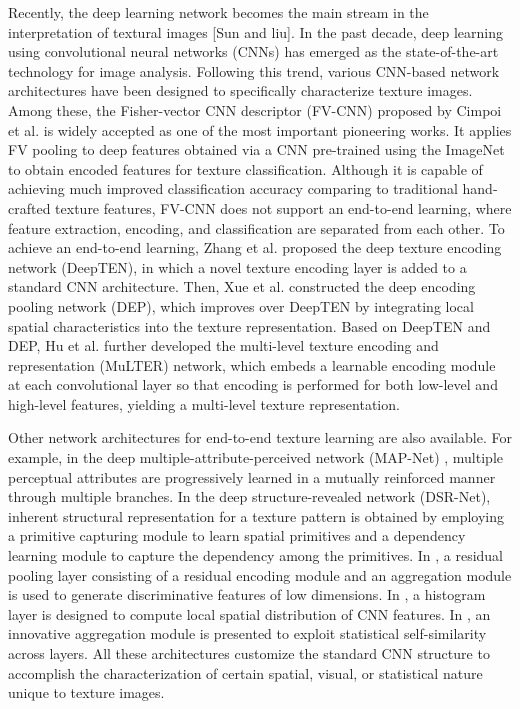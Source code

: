 \documentclass{aci}
\numberwithin{equation}{section}
\begin{document}
Recently, the deep learning network becomes the main stream in the
interpretation of textural images [Sun and liu]. In the past decade, deep
learning using convolutional neural networks (CNNs)
\cite{krizhevsky_imagenet_2017} has emerged as the state-of-the-art technology
for image analysis. Following this trend, various CNN-based network
architectures have been designed to specifically characterize texture images.
Among these, the Fisher-vector CNN descriptor (FV-CNN) proposed by Cimpoi et al.
\cite{cimpoi_describing_2014} is widely accepted as one of the most important
pioneering works. It applies FV pooling to deep features obtained via a CNN
pre-trained using the ImageNet \cite{krizhevsky_imagenet_2017} to obtain encoded
features for texture classification. Although it is capable of achieving much
improved classification accuracy comparing to traditional hand-crafted texture
features, FV-CNN does not support an end-to-end learning, where feature
extraction, encoding, and classification are separated from each other. To
achieve an end-to-end learning, Zhang et al. \cite{zhang_visual_2018} proposed
the deep texture encoding network (DeepTEN), in which a novel texture encoding
layer is added to a standard CNN architecture. Then, Xue et al.
\cite{xue_deep_2018} constructed the deep encoding pooling network (DEP), which
improves over DeepTEN by integrating local spatial characteristics into the
texture representation. Based on DeepTEN and DEP, Hu et al. \cite{hu_multi_2019}
further developed the multi-level texture encoding and representation (MuLTER)
network, which embeds a learnable encoding module at each convolutional layer so
that encoding is performed for both low-level and high-level features, yielding
a multi-level texture representation.

Other network architectures for end-to-end texture learning are also available.
For example, in the deep multiple-attribute-perceived network (MAP-Net)
\cite{zhai_deep_2019}, multiple perceptual attributes are progressively learned
in a mutually reinforced manner through multiple branches. In the deep
structure-revealed network (DSR-Net)\cite{zhai_deep_2020}, inherent structural
representation for a texture pattern is obtained by employing a primitive
capturing module to learn spatial primitives and a dependency learning module to
capture the dependency among the primitives. In \cite{mao_deep_2021}, a residual
pooling layer consisting of a residual encoding module and an aggregation module
is used to generate discriminative features of low dimensions. In
\cite{peeples_histogram_2021}, a histogram layer is designed to compute local
spatial distribution of CNN features. In \cite{chen_deep_2021}, an innovative
aggregation module is presented to exploit statistical self-similarity across
layers. All these architectures customize the standard CNN structure to
accomplish the characterization of certain spatial, visual, or statistical
nature unique to texture images.
\end{document}

